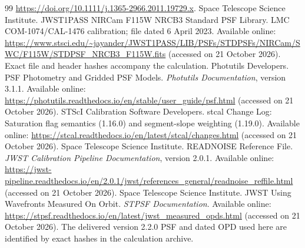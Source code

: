 \documentclass[galaxies,article,submit,oneauthor]{Definitions/mdpi}
\begin{document}
\begin{thebibliography}{99}
\href{https://doi.org/10.1111/j.1365-2966.2011.19729.x}{https://doi.org/10.1111/j.1365-2966.2011.19729.x}.
Space Telescope Science Institute. JWST1PASS NIRCam F115W NRCB3 Standard
PSF Library. LMC COM-1074/CAL-1476 calibration; file dated 6 April 2023.
Available online: \url{https://www.stsci.edu/~jayander/JWST1PASS/LIB/PSFs/STDPSFs/NIRCam/SWC/F115W/STDPSF_NRCB3_F115W.fits}
(accessed on 21 October 2026). Exact file and header hashes accompany the calculation.
Photutils Developers. PSF Photometry and Gridded PSF Models.
\emph{Photutils Documentation}, version 3.1.1.
Available online: \url{https://photutils.readthedocs.io/en/stable/user_guide/psf.html}
(accessed on 21 October 2026).
STScI Calibration Software Developers. stcal Change Log:
Saturation flag semantics (1.16.0) and segment-slope weighting (1.19.0).
Available online: \url{https://stcal.readthedocs.io/en/latest/stcal/changes.html}
(accessed on 21 October 2026).
Space Telescope Science Institute. READNOISE Reference File.
\emph{JWST Calibration Pipeline Documentation}, version 2.0.1.
Available online:
\url{https://jwst-pipeline.readthedocs.io/en/2.0.1/jwst/references_general/readnoise_reffile.html}
(accessed on 21 October 2026).
Space Telescope Science Institute. JWST Using Wavefronts Measured On Orbit.
\emph{STPSF Documentation}.
Available online: \url{https://stpsf.readthedocs.io/en/latest/jwst_measured_opds.html}
(accessed on 21 October 2026). The delivered version 2.2.0 PSF and dated OPD
used here are identified by exact hashes in the calculation archive.
\end{thebibliography}
\end{document}
